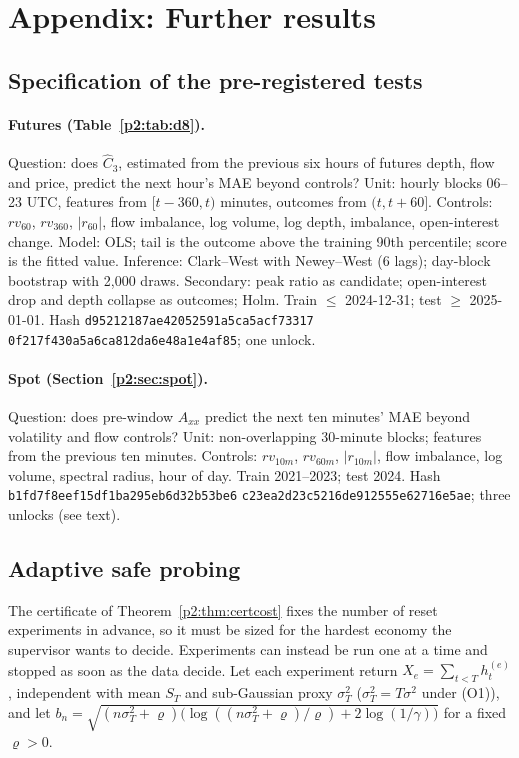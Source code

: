 \section{Appendix: Further results}\label{p2:app:ia}

\subsection{Specification of the pre-registered tests}
\paragraph{Futures (Table~\ref{p2:tab:d8}).} Question: does $\hat C_3$, estimated from the previous six hours of futures depth, flow and price, predict the next hour's MAE beyond controls? Unit: hourly blocks 06--23 UTC, features from $[t-360,t)$ minutes, outcomes from $(t,t+60]$. Controls: $rv_{60}$, $rv_{360}$, $|r_{60}|$, flow imbalance, log volume, log depth, imbalance, open-interest change. Model: OLS; tail is the outcome above the training 90th percentile; score is the fitted value. Inference: Clark--West with Newey--West (6 lags); day-block bootstrap with 2,000 draws. Secondary: peak ratio as candidate; open-interest drop and depth collapse as outcomes; Holm. Train $\le$ 2024-12-31; test $\ge$ 2025-01-01. Hash \texttt{d95212187ae42052591a5ca5acf73317} \texttt{0f217f430a5a6ca812da6e48a1e4af85}; one unlock.

\paragraph{Spot (Section~\ref{p2:sec:spot}).} Question: does pre-window $A_{xx}$ predict the next ten minutes' MAE beyond volatility and flow controls? Unit: non-overlapping 30-minute blocks; features from the previous ten minutes. Controls: $rv_{10m}$, $rv_{60m}$, $|r_{10m}|$, flow imbalance, log volume, spectral radius, hour of day. Train 2021--2023; test 2024. Hash \texttt{b1fd7f8eef15df1ba295eb6d32b53be6} \texttt{c23ea2d23c5216de912555e62716e5ae}; three unlocks (see text).

\subsection{Adaptive safe probing}\label{p2:app:probe}
The certificate of Theorem~\ref{p2:thm:certcost} fixes the number of reset experiments in advance, so it must be sized for the hardest economy the supervisor wants to decide. Experiments can instead be run one at a time and stopped as soon as the data decide. Let each experiment return $X_e=\sum_{t<T}h^{(e)}_t$, independent with mean $S_T$ and sub-Gaussian proxy $\sigma_T^2$ ($\sigma_T^2=T\sigma^2$ under (O1)), and let $b_n=\sqrt{(n\sigma_T^2+\varrho)\bigl(\log((n\sigma_T^2+\varrho)/\varrho)+2\log(1/\gamma)\bigr)}$ for a fixed $\varrho>0$.

